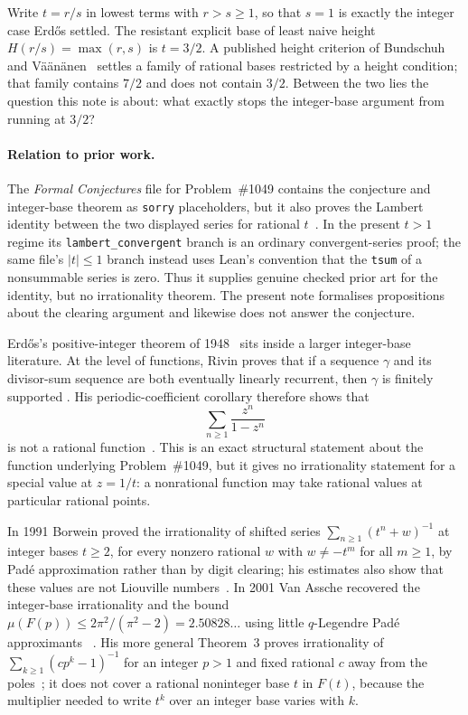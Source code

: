 \documentclass[11pt]{article}
\begin{document}
Write $t=r/s$ in lowest terms with $r>s\ge1$, so that $s=1$ is exactly the
integer case Erd\H{o}s settled.  The resistant explicit base of least naive
height $H(r/s)=\max(r,s)$ is $t=3/2$.  A published height criterion of Bundschuh and
V\"a\"an\"anen~\cite[Thm.~2, p.~177; hypotheses pp.~175--176]{bv1994}
settles a family of rational bases restricted by a
height condition; that family contains $7/2$ and does not contain $3/2$.
Between the two lies the question this note is about: what exactly stops the
integer-base argument from running at $3/2$?

\paragraph{Relation to prior work.}
The \emph{Formal Conjectures} file for Problem~\#1049 contains the conjecture
and integer-base theorem as \texttt{sorry} placeholders, but it also proves
the Lambert identity between the two displayed series for rational
$t$~\cite{formalconjectures1049}.  In the present $t>1$ regime its
\texttt{lambert\_convergent} branch is an ordinary convergent-series proof;
the same file's $|t|\le1$ branch instead uses Lean's convention that the
\texttt{tsum} of a nonsummable series is zero.  Thus it supplies genuine
checked prior art for the identity, but no irrationality theorem.  The present
note formalises propositions about the clearing argument and likewise does
not answer the conjecture.

Erd\H{o}s's positive-integer theorem of
1948~\cite{erdos1948} sits inside a larger integer-base literature.
At the level of functions, Rivin proves that if a sequence \(\gamma\) and its
divisor-sum sequence are both eventually linearly recurrent, then \(\gamma\)
is finitely supported
\cite[Theorem~1.1, p.~2; proof pp.~6--7]{rivin2026}.
His periodic-coefficient corollary therefore shows that
\[
  \sum_{n\ge1}\frac{z^n}{1-z^n}
\]
is not a rational function~\cite[Corollary~6.4, p.~9]{rivin2026}.
This is an exact structural statement about the function underlying
Problem~\#1049, but it gives no irrationality statement for a special value
at \(z=1/t\): a nonrational function may take rational values at particular
rational points.

In 1991
Borwein proved the irrationality of shifted series
$\sum_{n\ge1}(t^{n}+w)^{-1}$ at integer bases $t\ge2$, for every nonzero
rational $w$ with $w\ne-t^m$ for all $m\ge1$, by Pad\'e approximation rather
than by digit clearing; his estimates also show that these values are not
Liouville numbers~\cite[Thm.~4, pp.~257--258]{borwein1991}.  In 2001 Van
Assche recovered the integer-base irrationality and the bound
$\mu(F(p))\le 2\pi^2/(\pi^2-2)=2.50828\ldots$ using little $q$-Legendre
Pad\'e approximants
~\cite[Thm.~1, p.~10; proof pp.~10--11]{vanassche2001}.  His more general
Theorem~3 proves irrationality of
$\sum_{k\ge1}(cp^k-1)^{-1}$ for an integer $p>1$ and fixed rational $c$
away from the poles~\cite[Thm.~3, p.~14]{vanassche2001}; it does not cover a
rational noninteger base $t$ in $F(t)$, because the multiplier needed to
write $t^k$ over an integer base varies with $k$.
\end{document}
